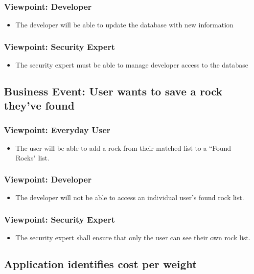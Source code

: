 \documentclass[titlepage]{article}
\begin{document}
	\subsubsection {Viewpoint: Developer}
		\begin{itemize}
			\item The developer will be able to update the database with new information
		\end{itemize}
	\subsubsection {Viewpoint: Security Expert}
		\begin{itemize}
			\item The security expert must be able to manage developer access to the database
		\end{itemize}
\subsection {Business Event: User wants to save a rock they've found}
	\subsubsection {Viewpoint: Everyday User}
		\begin{itemize}
			\item The user will be able to add a rock from their matched list to a ``Found Rocks" list.
		\end{itemize}
	\subsubsection {Viewpoint: Developer}
		\begin{itemize}
			\item The developer will not be able to access an individual user's found rock list.
		\end{itemize}
	\subsubsection {Viewpoint: Security Expert}
		\begin{itemize}
			\item The security expert shall ensure that only the user can see their own rock list.
		\end{itemize}
\subsection{Application identifies cost per weight }
\end{document}
